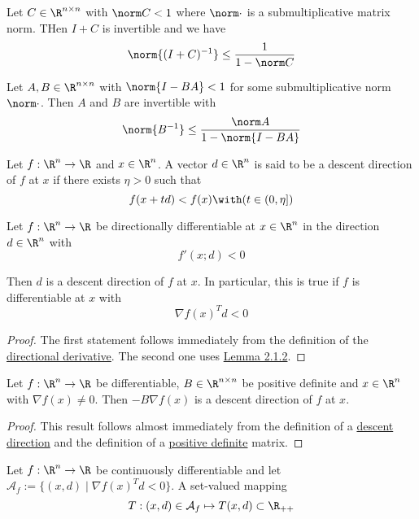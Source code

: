 \label{c733e75}

Let $C\in\R^{n\times n}$ with $\norm C<1$ where $\norm\cdot$ is a
submultiplicative matrix norm. THen $I+C$ is invertible and we have
$$
  \norm{(I+C)^{-1}}\leq\frac1{1-\norm C}
$$

\label{ae04fae}

Let $A,B\in\R^{n\times n}$ with $\norm{I-BA}<1$ for some submultiplicative norm
$\norm\cdot$. Then $A$ and $B$ are invertible with
$$
  \norm{B^{-1}}\leq\frac{\norm A}{1-\norm{I-BA}}
$$

\label{ac99a6d}

Let $f:\R^n\to\R$ and $x\in\R^n$. A vector $d\in\R^n$ is said to be a descent
direction of $f$ at $x$ if there exists $\eta>0$ such that
$$
  f(x+td)<f(x)\with(t\in(0,\eta])
$$

\label{f81d53c}

Let $f:\R^n\to\R$ be directionally differentiable at $x\in\R^n$ in the
direction $d\in\R^n$ with
$$
  f'(x;d)<0
$$

Then $d$ is a descent direction of $f$ at $x$. In particular, this is true if
$f$ is differentiable at $x$ with
$$
  \nabla f(x)^Td<0
$$

\begin{proof}
  The first statement follows immediately from the definition of the
  \href{37eb747}{directional derivative}. The second one uses
  \href{ed67d29}{Lemma 2.1.2}.
\end{proof}

\label{c41d0f0}

Let $f:\R^n\to\R$ be differentiable, $B\in\R^{n\times n}$ be positive definite
and $x\in\R^n$ with $\nabla f(x)\neq0$. Then $-B\nabla f(x)$ is a descent
direction of $f$ at $x$.

\begin{proof}
  This result follows almost immediately from the definition of a
  \href{37eb747}{descent direction} and the definition of a
  \href{e25e722}{positive definite} matrix.
\end{proof}

\label{ae4eac6}

Let $f:{\R}^n\to{\R}$ be continuously differentiable and let $\mathcal
A_f:=\{(x,d)\mid\nabla f(x)^Td<0\}$. A set-valued mapping
$$
  T:(x,d)\in\mathcal A_f\mapsto T(x,d)\subset\R_{++}
$$

